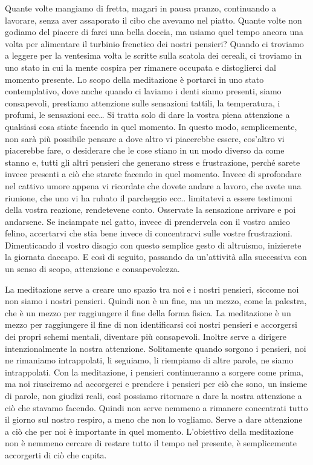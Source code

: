 \documentclass[12pt]{book} %
\begin{document}
Quante volte mangiamo di fretta, magari in pausa pranzo, continuando a lavorare, senza aver assaporato il cibo che
avevamo nel piatto. Quante volte non godiamo del piacere di farci una bella doccia, ma usiamo quel tempo ancora una
volta per alimentare il turbinio frenetico dei nostri pensieri? Quando ci troviamo a leggere per la ventesima volta le
scritte sulla scatola dei cereali, ci troviamo in uno stato in cui la mente cospira per rimanere occupata e
distoglierci dal momento presente. Lo scopo della meditazione è portarci in uno stato contemplativo, dove anche quando
ci laviamo i denti siamo presenti, siamo consapevoli, prestiamo attenzione sulle sensazioni tattili, la temperatura, i
profumi, le sensazioni ecc… Si tratta solo di dare la vostra piena attenzione a qualsiasi cosa stiate facendo in quel
momento. In questo modo, semplicemente, non sarà più possibile pensare a dove altro vi piacerebbe essere,
cos'altro vi piacerebbe fare, o desiderare che le cose stiano in un modo diverso da come stanno e,
tutti gli altri pensieri che generano stress e frustrazione, perché sarete invece presenti a ciò che starete facendo in
quel momento. Invece di sprofondare nel cattivo umore appena vi ricordate che dovete andare a lavoro, che avete una
riunione, che uno vi ha rubato il parcheggio ecc.. limitatevi a essere testimoni della vostra reazione, rendetevene
conto. Osservate la sensazione arrivare e poi andarsene. Se inciampate nel gatto, invece di prendervela con il vostro
amico felino, accertarvi che stia bene invece di concentrarvi sulle vostre frustrazioni. Dimenticando il vostro disagio
con questo semplice gesto di altruismo, inizierete la giornata daccapo. E così di seguito, passando da
un'attività alla successiva con un senso di scopo, attenzione e consapevolezza.

La meditazione serve a creare uno spazio tra noi e i nostri pensieri, siccome noi non siamo i nostri pensieri. Quindi
non è un fine, ma un mezzo, come la palestra, che è un mezzo per raggiungere il fine della forma fisica. La meditazione
è un mezzo per raggiungere il fine di non identificarsi coi nostri pensieri e accorgersi dei propri schemi mentali,
diventare più consapevoli. Inoltre serve a dirigere intenzionalmente la nostra attenzione. Solitamente quando sorgono i
pensieri, noi ne rimaniamo intrappolati, li seguiamo, li riempiamo di altre parole, ne siamo intrappolati. Con la
meditazione, i pensieri continueranno a sorgere come prima, ma noi riusciremo ad accorgerci e prendere i pensieri per
ciò che sono, un insieme di parole, non giudizi reali, così possiamo ritornare a dare la nostra attenzione a ciò che
stavamo facendo. Quindi non serve nemmeno a rimanere concentrati tutto il giorno sul nostro respiro, a meno che non lo
vogliamo. Serve a dare attenzione a ciò che per noi è importante in quel momento. L'obiettivo della meditazione non è
nemmeno cercare di restare tutto il tempo nel presente, è semplicemente accorgerti di ciò che capita.
\end{document}
